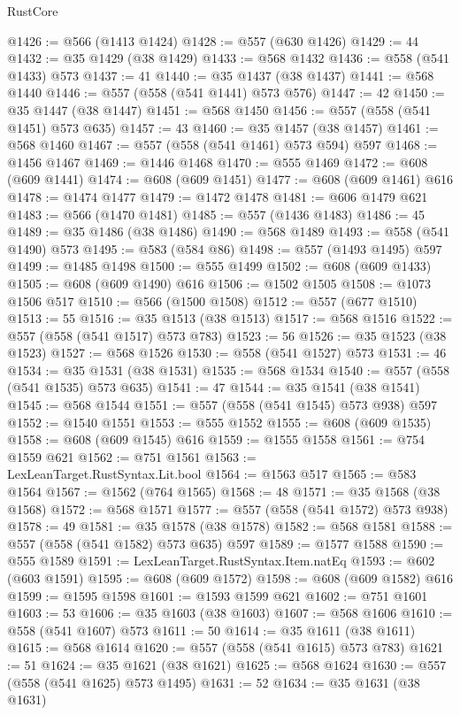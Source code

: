 \begin{lexlean}{RustCore}
\begin{coremodule}
@1426 := @566 (@1413 @1424)
@1428 := @557 (@630 @1426)
@1429 := 44
@1432 := @35 @1429 (@38 @1429)
@1433 := @568 @1432
@1436 := @558 (@541 @1433) @573
@1437 := 41
@1440 := @35 @1437 (@38 @1437)
@1441 := @568 @1440
@1446 := @557 (@558 (@541 @1441) @573 @576)
@1447 := 42
@1450 := @35 @1447 (@38 @1447)
@1451 := @568 @1450
@1456 := @557 (@558 (@541 @1451) @573 @635)
@1457 := 43
@1460 := @35 @1457 (@38 @1457)
@1461 := @568 @1460
@1467 := @557 (@558 (@541 @1461) @573 @594) @597
@1468 := @1456 @1467
@1469 := @1446 @1468
@1470 := @555 @1469
@1472 := @608 (@609 @1441)
@1474 := @608 (@609 @1451)
@1477 := @608 (@609 @1461) @616
@1478 := @1474 @1477
@1479 := @1472 @1478
@1481 := @606 @1479 @621
@1483 := @566 (@1470 @1481)
@1485 := @557 (@1436 @1483)
@1486 := 45
@1489 := @35 @1486 (@38 @1486)
@1490 := @568 @1489
@1493 := @558 (@541 @1490) @573
@1495 := @583 (@584 @86)
@1498 := @557 (@1493 @1495) @597
@1499 := @1485 @1498
@1500 := @555 @1499
@1502 := @608 (@609 @1433)
@1505 := @608 (@609 @1490) @616
@1506 := @1502 @1505
@1508 := @1073 @1506 @517
@1510 := @566 (@1500 @1508)
@1512 := @557 (@677 @1510)
@1513 := 55
@1516 := @35 @1513 (@38 @1513)
@1517 := @568 @1516
@1522 := @557 (@558 (@541 @1517) @573 @783)
@1523 := 56
@1526 := @35 @1523 (@38 @1523)
@1527 := @568 @1526
@1530 := @558 (@541 @1527) @573
@1531 := 46
@1534 := @35 @1531 (@38 @1531)
@1535 := @568 @1534
@1540 := @557 (@558 (@541 @1535) @573 @635)
@1541 := 47
@1544 := @35 @1541 (@38 @1541)
@1545 := @568 @1544
@1551 := @557 (@558 (@541 @1545) @573 @938) @597
@1552 := @1540 @1551
@1553 := @555 @1552
@1555 := @608 (@609 @1535)
@1558 := @608 (@609 @1545) @616
@1559 := @1555 @1558
@1561 := @754 @1559 @621
@1562 := @751 @1561
@1563 := LexLeanTarget.RustSyntax.Lit.bool
@1564 := @1563 @517
@1565 := @583 @1564
@1567 := @1562 (@764 @1565)
@1568 := 48
@1571 := @35 @1568 (@38 @1568)
@1572 := @568 @1571
@1577 := @557 (@558 (@541 @1572) @573 @938)
@1578 := 49
@1581 := @35 @1578 (@38 @1578)
@1582 := @568 @1581
@1588 := @557 (@558 (@541 @1582) @573 @635) @597
@1589 := @1577 @1588
@1590 := @555 @1589
@1591 := LexLeanTarget.RustSyntax.Item.natEq
@1593 := @602 (@603 @1591)
@1595 := @608 (@609 @1572)
@1598 := @608 (@609 @1582) @616
@1599 := @1595 @1598
@1601 := @1593 @1599 @621
@1602 := @751 @1601
@1603 := 53
@1606 := @35 @1603 (@38 @1603)
@1607 := @568 @1606
@1610 := @558 (@541 @1607) @573
@1611 := 50
@1614 := @35 @1611 (@38 @1611)
@1615 := @568 @1614
@1620 := @557 (@558 (@541 @1615) @573 @783)
@1621 := 51
@1624 := @35 @1621 (@38 @1621)
@1625 := @568 @1624
@1630 := @557 (@558 (@541 @1625) @573 @1495)
@1631 := 52
@1634 := @35 @1631 (@38 @1631)

\end{coremodule}
\end{lexlean}
